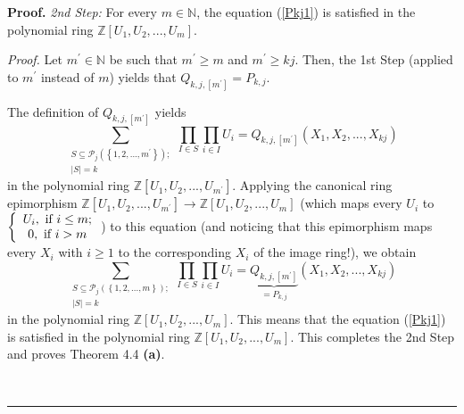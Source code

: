 \documentclass[numbers=enddot,12pt,final,onecolumn,notitlepage]{scrartcl}%
\newenvironment{proof}[1][Proof]{\noindent\textbf{#1.} }{\ \rule{0.5em}{0.5em}}
\begin{document}
\begin{proof}
\textit{2nd Step:} For every $m\in\mathbb{N}$, the equation (\ref{Pkj1}) is
satisfied in the polynomial ring $\mathbb{Z}\left[  U_{1},U_{2},...,U_{m}%
\right]  $.

\textit{Proof.} Let $m^{\prime}\in\mathbb{N}$ be such that $m^{\prime}\geq m$
and $m^{\prime}\geq kj$. Then, the 1st Step (applied to $m^{\prime}$ instead
of $m$) yields that $Q_{k,j,\left[  m^{\prime}\right]  }=P_{k,j}.$

The definition of $Q_{k,j,\left[  m^{\prime}\right]  }$ yields
\[
\sum_{\substack{S\subseteq\mathcal{P}_{j}\left(  \left\{  1,2,...,m^{\prime
}\right\}  \right)  ;\\\left\vert S\right\vert =k}}\prod_{I\in S}\prod_{i\in
I}U_{i}=Q_{k,j,\left[  m^{\prime}\right]  }\left(  X_{1},X_{2},...,X_{kj}%
\right)
\]
in the polynomial ring $\mathbb{Z}\left[  U_{1},U_{2},...,U_{m^{\prime}%
}\right]  $. Applying the canonical ring epimorphism $\mathbb{Z}\left[
U_{1},U_{2},...,U_{m^{\prime}}\right]  \rightarrow\mathbb{Z}\left[
U_{1},U_{2},...,U_{m}\right]  $ (which maps every $U_{i}$ to $\left\{
\begin{array}
[c]{c}%
U_{i},\text{ if }i\leq m;\\
0,\text{ if }i>m
\end{array}
\right.  $) to this equation (and noticing that this epimorphism maps every
$X_{i}$ with $i\geq1$ to the corresponding $X_{i}$ of the image ring!), we
obtain%
\[
\sum_{\substack{S\subseteq\mathcal{P}_{j}\left(  \left\{  1,2,...,m\right\}
\right)  ;\\\left\vert S\right\vert =k}}\prod_{I\in S}\prod_{i\in I}%
U_{i}=\underbrace{Q_{k,j,\left[  m^{\prime}\right]  }}_{=P_{k,j}}\left(
X_{1},X_{2},...,X_{kj}\right)
\]
in the polynomial ring $\mathbb{Z}\left[  U_{1},U_{2},...,U_{m}\right]  .$
This means that the equation (\ref{Pkj1}) is satisfied in the polynomial ring
$\mathbb{Z}\left[  U_{1},U_{2},...,U_{m}\right]  .$ This completes the 2nd
Step and proves Theorem 4.4 \textbf{(a)}.


\end{proof}
\end{document}
